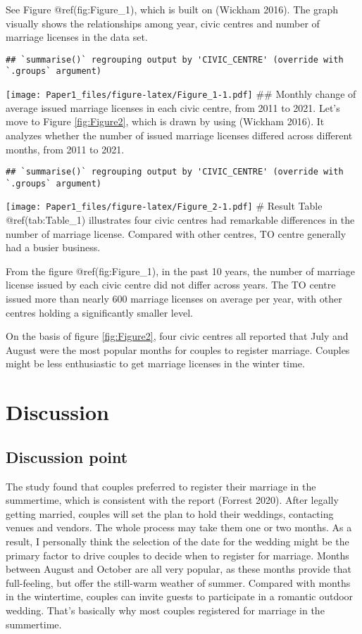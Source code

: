 \documentclass[
]{article}
\begin{document}
See Figure @ref(fig:Figure\_1), which is built on (Wickham 2016). The graph visually shows the relationships among year, civic centres and number of marriage licenses in the data set.

\begin{verbatim}
## `summarise()` regrouping output by 'CIVIC_CENTRE' (override with `.groups` argument)
\end{verbatim}

\texttt{[image: Paper1\_files/figure-latex/Figure\_1-1.pdf]}
\#\# Monthly change of average issued marriage licenses in each civic centre, from 2011 to 2021.
Let's move to Figure \ref{fig:Figure2}, which is drawn by using (Wickham 2016). It analyzes whether the number of issued marriage licenses differed across different months, from 2011 to 2021.

\begin{verbatim}
## `summarise()` regrouping output by 'CIVIC_CENTRE' (override with `.groups` argument)
\end{verbatim}

\texttt{[image: Paper1\_files/figure-latex/Figure\_2-1.pdf]}
\# Result
Table @ref(tab:Table\_1) illustrates four civic centres had remarkable differences in the number of marriage license. Compared with other centres, TO centre generally had a busier business.

From the figure @ref(fig:Figure\_1), in the past 10 years, the number of marriage license issued by each civic centre did not differ across years. The TO centre issued more than nearly 600 marriage licenses on average per year, with other centres holding a significantly smaller level.

On the basis of figure \ref{fig:Figure2}, four civic centres all reported that July and August were the most popular months for couples to register marriage. Couples might be less enthusiastic to get marriage licenses in the winter time.

\hypertarget{discussion}{%
\section{Discussion}\label{discussion}}

\hypertarget{discussion-point}{%
\subsection{Discussion point}\label{discussion-point}}

The study found that couples preferred to register their marriage in the summertime, which is consistent with the report (Forrest 2020). After legally getting married, couples will set the plan to hold their weddings, contacting venues and vendors. The whole process may take them one or two months. As a result, I personally think the selection of the date for the wedding might be the primary factor to drive couples to decide when to register for marriage. Months between August and October are all very popular, as these months provide that full-feeling, but offer the still-warm weather of summer. Compared with months in the wintertime, couples can invite guests to participate in a romantic outdoor wedding. That's basically why most couples registered for marriage in the summertime.
\end{document}
